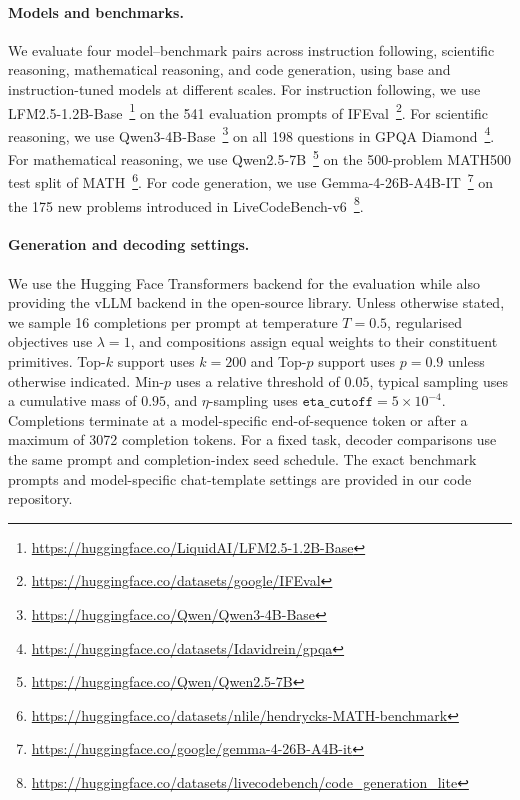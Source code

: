 \documentclass{article} %
\begin{document}
\paragraph{Models and benchmarks.}
We evaluate four model--benchmark pairs across instruction following, scientific reasoning, mathematical reasoning, and code generation, using base and instruction-tuned models at different scales. For instruction following, we use LFM2.5-1.2B-Base~\citep{liquidai2025lfm2}\footnote{\url{https://huggingface.co/LiquidAI/LFM2.5-1.2B-Base}} on the 541 evaluation prompts of IFEval~\citep{zhou2023instruction}\footnote{\url{https://huggingface.co/datasets/google/IFEval}}.
For scientific reasoning, we use Qwen3-4B-Base~\citep{yang2025qwen3}\footnote{\url{https://huggingface.co/Qwen/Qwen3-4B-Base}} on all 198 questions in GPQA Diamond~\citep{rein2024gpqa}\footnote{\url{https://huggingface.co/datasets/Idavidrein/gpqa}}. 
For mathematical reasoning, we use Qwen2.5-7B~\citep{qwen2025qwen25technicalreport}\footnote{\url{https://huggingface.co/Qwen/Qwen2.5-7B}} on the 500-problem MATH500 test split of MATH~\citep{hendrycks2021math}\footnote{\url{https://huggingface.co/datasets/nlile/hendrycks-MATH-benchmark}}.
For code generation, we use Gemma-4-26B-A4B-IT~\citep{gemmateam2026gemma4}\footnote{\url{https://huggingface.co/google/gemma-4-26B-A4B-it}} on the 175 new problems introduced in LiveCodeBench-v6~\citep{jain2024livecodebench}\footnote{\url{https://huggingface.co/datasets/livecodebench/code_generation_lite}}.

\paragraph{Generation and decoding settings.}
We use the Hugging Face Transformers backend for the evaluation while also providing the vLLM backend in the open-source library.
Unless otherwise stated, we sample 16 completions per prompt at temperature $T=0.5$, regularised objectives use $\lambda=1$, and compositions assign equal weights to their constituent primitives.
Top-$k$ support uses $k=200$ and Top-$p$ support uses $p=0.9$ unless otherwise indicated. 
Min-$p$ uses a relative threshold of $0.05$, typical sampling uses a cumulative mass of $0.95$, and $\eta$-sampling uses $\texttt{eta\_cutoff}=5\times10^{-4}$.
Completions terminate at a model-specific end-of-sequence token or after a maximum of 3072 completion tokens. For a fixed task, decoder comparisons use the same prompt and completion-index seed schedule. The exact benchmark prompts and model-specific chat-template settings are provided in our code repository.
\end{document}
